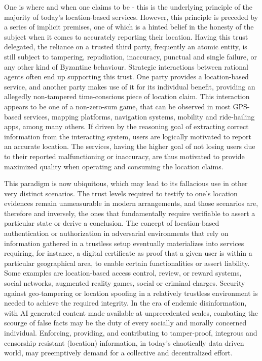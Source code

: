 
One is where and when one claims to be - this is the underlying principle of the majority of today's location-based services. However, this principle is preceded by a series of implicit premises, one of which is a hinted belief in the honesty of the subject when it comes to accurately reporting their location. Having this trust delegated, the reliance on a trusted third party, frequently an atomic entity, is still subject to tampering, repudiation, inaccuracy, punctual and single failure, or any other kind of Byzantine behaviour. Strategic interactions between rational agents often end up supporting this trust. One party provides a location-based service, and another party makes use of it for its individual benefit, providing an allegedly non-tampered time-conscious piece of location claim. This interaction appears to be one of a non-zero-sum game, that can be observed in most GPS-based services, mapping platforms, navigation systems, mobility and ride-hailing apps, among many others. If driven by the reasoning goal of extracting correct information from the interacting system, users are logically motivated to report an accurate location. The services, having the higher goal of not losing users due to their reported malfunctioning or inaccuracy, are thus motivated to provide maximized quality when operating and consuming the location claims. 

This paradigm is now ubiquitous, which may lead to its fallacious use in other very distinct scenarios. The trust levels required to testify to one's location evidences remain unmeasurable in modern arrangements, and those scenarios are, therefore and inversely, the ones that fundamentally require verifiable \pol{} to assert a particular state or derive a conclusion.  The concept of location-based authentication or authorization in adversarial environments that rely on information gathered in a trustless setup eventually materializes into services requiring, for instance, a digital certificate as proof that a given user is within a particular geographical area, to enable certain functionalities or assert liability. Some examples are location-based access control, review, or reward systems, social networks, augmented reality games, social or criminal charges. Security against geo-tampering or location spoofing in a relatively trustless environment is needed to achieve the required integrity. In the era of endemic disinformation, with AI generated content made available at unprecedented scales, combating the scourge of false facts may be the duty of every socially and morally concerned individual. Enforcing, providing, and contributing to tamper-proof, integrous and censorship resistant (location) information, in today's chaotically data driven world, may preemptively demand for a collective and decentralized effort. 

